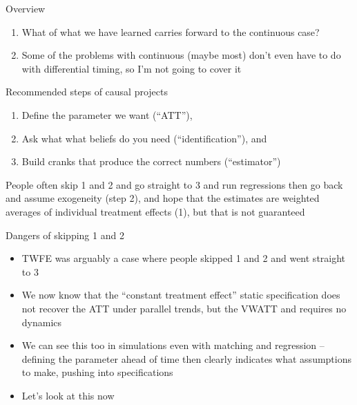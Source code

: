 \documentclass{beamer}
\begin{document}
\begin{frame}{Overview}

\begin{enumerate}
\item What of what we have learned carries forward to the continuous case?
\item Some of the problems with continuous (maybe most) don't even have to do with differential timing, so I'm not going to cover it
\end{enumerate}

\end{frame}

\begin{frame}{Recommended steps of causal projects}

\begin{enumerate}
\item Define the parameter we want (``ATT''), 
\item Ask what what beliefs do you need (``identification''), and 
\item Build cranks that produce the correct numbers (``estimator'')
\end{enumerate}

\bigskip

People often skip 1 and 2 and go straight to 3 and run regressions then go back and assume exogeneity (step 2), and hope that the estimates are weighted averages of individual treatment effects (1), but that is not guaranteed

\end{frame}

\begin{frame}{Dangers of skipping 1 and 2}

\begin{itemize}

\item TWFE was arguably a case where people skipped 1 and 2 and went straight to 3
\item We now know that the ``constant treatment effect'' static specification does not recover the ATT under parallel trends, but the VWATT and requires no dynamics
\item We can see this too in simulations even with matching and regression -- defining the parameter ahead of time then clearly indicates what assumptions to make, pushing into specifications
\item Let's look at this now
\end{itemize}

\end{frame}
\end{document}
